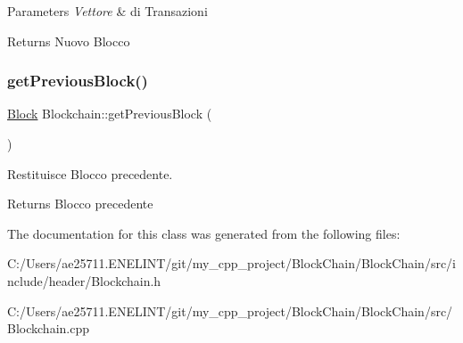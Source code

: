 \begin{DoxyParams}{Parameters}
{\em Vettore} & di Transazioni \\
\hline
\end{DoxyParams}
\begin{DoxyReturn}{Returns}
Nuovo Blocco 
\end{DoxyReturn}
\mbox{\label{class_blockchain_ad283b392e91aee3d33e46199b33aa9a1}} 
\subsubsection{\texorpdfstring{get\+Previous\+Block()}{getPreviousBlock()}}
{\footnotesize\ttfamily \mbox{\hyperlink{class_block}{Block}} Blockchain\+::get\+Previous\+Block (\begin{DoxyParamCaption}{ }\end{DoxyParamCaption})\hspace{0.3cm}{\ttfamily [virtual]}}



Restituisce Blocco precedente. 

\begin{DoxyReturn}{Returns}
Blocco precedente 
\end{DoxyReturn}


The documentation for this class was generated from the following files\+:\begin{DoxyCompactItemize}
\item 
C\+:/\+Users/ae25711.\+E\+N\+E\+L\+I\+N\+T/git/my\+\_\+cpp\+\_\+project/\+Block\+Chain/\+Block\+Chain/src/include/header/Blockchain.\+h\item 
C\+:/\+Users/ae25711.\+E\+N\+E\+L\+I\+N\+T/git/my\+\_\+cpp\+\_\+project/\+Block\+Chain/\+Block\+Chain/src/Blockchain.\+cpp\end{DoxyCompactItemize}
